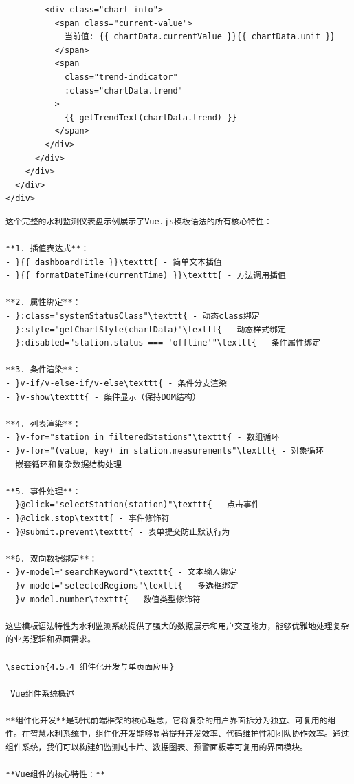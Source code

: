 {{\begin{verbatim}
        <div class="chart-info">
          <span class="current-value">
            当前值: {{ chartData.currentValue }}{{ chartData.unit }}
          </span>
          <span 
            class="trend-indicator"
            :class="chartData.trend"
          >
            {{ getTrendText(chartData.trend) }}
          </span>
        </div>
      </div>
    </div>
  </div>
</div>
\end{verbatim}

\begin{lstlisting}
这个完整的水利监测仪表盘示例展示了Vue.js模板语法的所有核心特性：

**1. 插值表达式**：
- }{{ dashboardTitle }}\texttt{ - 简单文本插值
- }{{ formatDateTime(currentTime) }}\texttt{ - 方法调用插值

**2. 属性绑定**：
- }:class="systemStatusClass"\texttt{ - 动态class绑定
- }:style="getChartStyle(chartData)"\texttt{ - 动态样式绑定
- }:disabled="station.status === 'offline'"\texttt{ - 条件属性绑定

**3. 条件渲染**：
- }v-if/v-else-if/v-else\texttt{ - 条件分支渲染
- }v-show\texttt{ - 条件显示（保持DOM结构）

**4. 列表渲染**：
- }v-for="station in filteredStations"\texttt{ - 数组循环
- }v-for="(value, key) in station.measurements"\texttt{ - 对象循环
- 嵌套循环和复杂数据结构处理

**5. 事件处理**：
- }@click="selectStation(station)"\texttt{ - 点击事件
- }@click.stop\texttt{ - 事件修饰符
- }@submit.prevent\texttt{ - 表单提交防止默认行为

**6. 双向数据绑定**：
- }v-model="searchKeyword"\texttt{ - 文本输入绑定
- }v-model="selectedRegions"\texttt{ - 多选框绑定
- }v-model.number\texttt{ - 数值类型修饰符

这些模板语法特性为水利监测系统提供了强大的数据展示和用户交互能力，能够优雅地处理复杂的业务逻辑和界面需求。

\section{4.5.4 组件化开发与单页面应用}

 Vue组件系统概述

**组件化开发**是现代前端框架的核心理念，它将复杂的用户界面拆分为独立、可复用的组件。在智慧水利系统中，组件化开发能够显著提升开发效率、代码维护性和团队协作效率。通过组件系统，我们可以构建如监测站卡片、数据图表、预警面板等可复用的界面模块。

**Vue组件的核心特性：**


\end{lstlisting}}}
